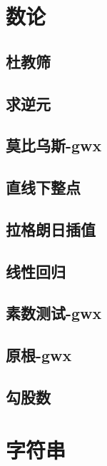 \documentclass[titlepage,a4paper,10pt]{article}
\begin{document}
\begin{spacing}{0.8}
		\section{数论}
			\subsection{杜教筛}
				
			\subsection{求逆元}
				
			\subsection{莫比乌斯-gwx}
				
			\subsection{直线下整点}
				
			\subsection{拉格朗日插值}
				
			\subsection{线性回归}
				
			\subsection{素数测试-gwx}
				
			\subsection{原根-gwx}
				
			\subsection{勾股数}
				
		\section{字符串}

\end{spacing}
\end{document}
